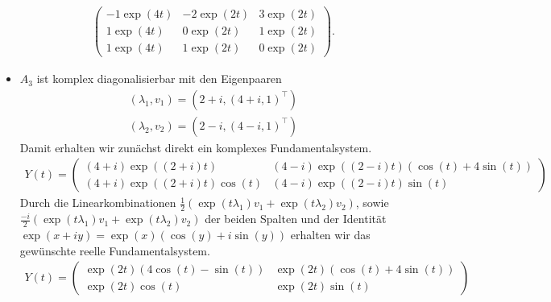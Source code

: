 \begin{solution}
\begin{itemize}
\begin{align*}
\begin{pmatrix}
    -1\exp(4t) & -2\exp(2t) & 3\exp(2t) \\
    1\exp(4t) & 0\exp(2t) & 1\exp(2t) \\
    1\exp(4t) & 1\exp(2t) & 0\exp(2t)
    \end{pmatrix}.
  \end{align*}
  \item $A_3$ ist komplex diagonalisierbar mit den Eigenpaaren
  \begin{align*}
    (\lambda_1,v_1) = (2 + i,(4+i,1)^{\top}) \\
    (\lambda_2,v_2) = (2-i,(4-i,1)^{\top})
  \end{align*}
  Damit erhalten wir zunächst direkt ein komplexes Fundamentalsystem.
  \begin{align*}
  Y(t) = \begin{pmatrix}
    (4+i)\exp((2+i)t)  & (4-i)\exp((2-i)t)(\cos(t) + 4\sin(t)) \\
    (4+i)\exp((2+i)t)\cos(t) & (4-i)\exp((2-i)t)\sin(t)
  \end{pmatrix}
  \end{align*}
  Durch die Linearkombinationen $\frac{1}{2}(\exp(t\lambda_1)v_1 + \exp(t\lambda_2)v_2)$, sowie
  $\frac{-i}{2}(\exp(t\lambda_1)v_1 + \exp(t\lambda_2)v_2)$ der beiden Spalten und der Identität
  $\exp(x + iy) = \exp(x)(\cos(y) + i\sin(y))$ erhalten wir das gewünschte reelle
  Fundamentalsystem.
  \begin{align*}
    Y(t) = \begin{pmatrix}
      \exp(2t)(4\cos(t) -\sin(t))  & \exp(2t)(\cos(t) + 4\sin(t)) \\
      \exp(2t)\cos(t) & \exp(2t)\sin(t)
    \end{pmatrix}
  \end{align*}
\end{itemize}


\end{solution}
